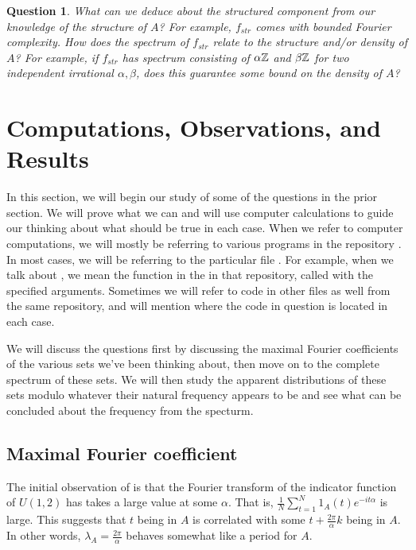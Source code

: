 \documentclass{article}
\newtheorem{question}[theorem]{Question}
\theoremstyle{definition}
\theoremstyle{remark}
\numberwithin{equation}{section}
\begin{document}
\begin{question}\label{qn:fourier_complexity_density}
  What can we deduce about the structured component from our knowledge
  of the structure of $A$?  For example, $f_{str}$ comes with bounded
  Fourier complexity.  How does the spectrum of $f_{str}$ relate to
  the structure and/or density of $A$?  For example, if $f_{str}$ has
  spectrum consisting of $\alpha\mathbb{Z}$ and $\beta\mathbb{Z}$ for two independent
  irrational $\alpha, \beta$, does this guarantee some bound on the
  density of $A$?  
\end{question}

\section{Computations, Observations, and Results}

In this section, we will begin our study of some of the questions in
the prior section.  We will prove what we can and will use computer
calculations to guide our thinking about what should be true in each
case.  When we refer to computer computations, we will mostly be
referring to various programs in the repository \cite{computations}.
In most cases, we will be referring to the particular file
.  For example, when we talk about
, we mean the function 
in the  in that repository, called with the
specified arguments.  Sometimes we will refer to code in other files
as well from the same repository, and will mention where the code in
question is located in each case.

We will discuss the questions first by discussing the maximal Fourier
coefficients of the various sets we've been thinking about, then move
on to the complete spectrum of these sets.  We will then study the
apparent distributions of these sets modulo whatever their natural
frequency appears to be and see what can be concluded about the
frequency from the specturm. 

\subsection{Maximal Fourier coefficient}

The initial observation of \cite{ulam_steinerberger} is that the
Fourier transform of the indicator function of $U(1,2)$ has takes a
large value at some $\alpha$.  That is,
$\frac1N \sum_{t=1}^N 1_A(t) e^{-it\alpha}$ is large.  This suggests
that $t$ being in $A$ is correlated with some
$t+\frac{2\pi}{\alpha} k$ being in $A$.  In other words,
$\lambda_A = \frac{2\pi}{\alpha}$ behaves somewhat like a period for
$A$.  
\end{document}
